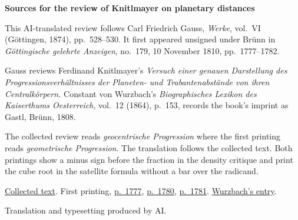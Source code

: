 \clearpage\thispagestyle{empty}
\begin{center}\textbf{Sources for the review of Knitlmayer on planetary distances}\end{center}
\noindent This AI-translated review follows Carl Friedrich Gauss, \textit{Werke}, vol.~VI (Göttingen, 1874), pp.~528--530. It first appeared unsigned under Brünn in \textit{Göttingische gelehrte Anzeigen}, no.~179, 10 November 1810, pp.~1777--1782.
\par\smallskip\noindent Gauss reviews Ferdinand Knitlmayer’s \textit{Versuch einer genauen Darstellung des Progressionsverhältnisses der Planeten- und Trabantenabstände von ihren Centralkörpern.} Constant von Wurzbach’s \textit{Biographisches Lexikon des Kaiserthums Oesterreich}, vol.~12 (1864), p.~153, records the book’s imprint as Gastl, Brünn, 1808.
\par\smallskip\noindent The collected review reads \emph{geocentrische Progression} where the first printing reads \emph{geometrische Progression}. The translation follows the collected text. Both printings show a minus sign before the fraction in the density critique and print the cube root in the satellite formula without a bar over the radicand.
\par\smallskip\noindent \href{https://gdz.sub.uni-goettingen.de/id/PPN236007467}{Collected text}. First printing, \href{https://images.p.sub.uni-goettingen.de/iiif/image/gdz:PPN319721507_1810:00001811/full/1650,/0/default.jpg}{p.~1777}, \href{https://images.p.sub.uni-goettingen.de/iiif/image/gdz:PPN319721507_1810:00001814/full/1650,/0/default.jpg}{p.~1780}, \href{https://images.p.sub.uni-goettingen.de/iiif/image/gdz:PPN319721507_1810:00001815/full/1650,/0/default.jpg}{p.~1781}. \href{https://repository.uibk.ac.at/filestore/servlet/GetFile?id=CHFZTKXMVZVIMCGAEKCS&convert=image/jpg&scale=3.33}{Wurzbach’s entry}.
\par\smallskip\noindent Translation and typesetting produced by AI.
\clearpage
